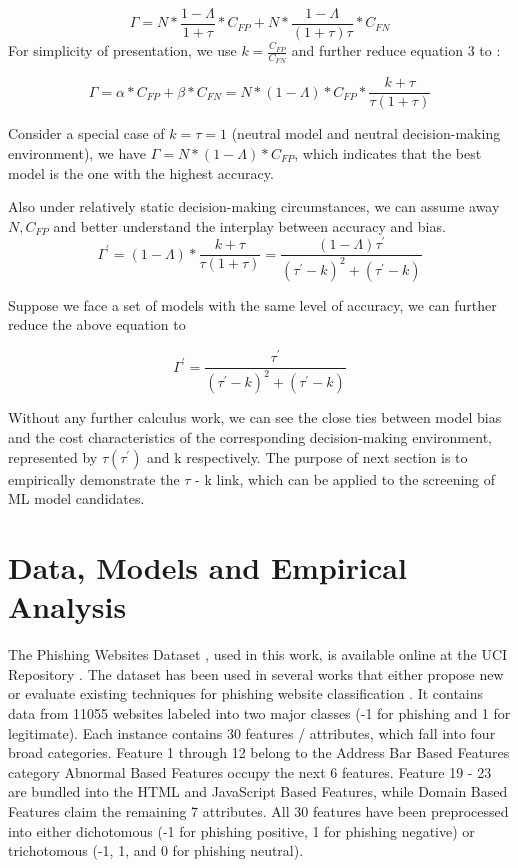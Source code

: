 \documentclass[deca,nonblindrev]{informs3} %
\begin{document}
\begin{equation}
\varGamma =  N*\frac {1-\varLambda}{1+\tau}*C_{FP} + N*\frac {1-\varLambda}{(1+\tau)\tau}*C_{FN}
\end{equation}
For simplicity of presentation, we use $k=\frac{C_{FP}}{C_{FN}}$ and further reduce  equation 3 to :

\begin{equation}
\varGamma = \alpha*C_{FP} + \beta*C_{FN} =  N*(1-\varLambda)*C_{FP}*\frac{k+\tau}{\tau(1+\tau)}
\end{equation}

Consider a special case of $ k=\tau=1$  (neutral model and neutral decision-making environment), we have  $\varGamma =  N*(1-\varLambda)*C_{FP}$, which indicates that the best model is the one with the highest accuracy.

Also under  relatively static decision-making circumstances, we can assume away $N, C_{FP} $ and better understand the interplay between accuracy and bias. 
\begin{equation}
\varGamma^{\prime} = (1-\varLambda)*\frac{k+\tau}{\tau(1+\tau)} = \frac{(1-\varLambda)\tau^\prime}{(\tau^\prime - k)^2+(\tau^\prime-k)}
\end{equation}

Suppose we face a set of models with the same level of accuracy, we can further reduce the above equation to

\begin{equation}
\varGamma^{\prime} = \frac{\tau^\prime}{(\tau^\prime - k)^2+(\tau^\prime-k)}
\end{equation} 

Without any further calculus work, we can see the close ties between model bias and the cost characteristics of the corresponding decision-making environment, represented by $\tau (\tau^\prime)$ and k respectively. The purpose of next section is to empirically demonstrate the $\tau$ -  k link, which can be applied to the screening of ML model candidates.


\section{Data, Models  and Empirical Analysis}

The Phishing Websites Dataset \citep{Mohammad2015} , used in this work, is available online at the UCI Repository \citep{Lichman:2013}. The dataset has been
used in several works that either propose new  or evaluate existing techniques for phishing website classification \citep{7727750, Mohammad2012, Mohammad2013, Mohammad2015a}. It contains data from 11055  websites  labeled into  two major classes (-1 for phishing and 1 for legitimate). Each instance contains 30 features / attributes, which fall into four broad categories. Feature 1 through 12 belong to the Address Bar Based Features category Abnormal Based Features occupy the next 6 features. Feature 19 - 23 are bundled into the HTML and JavaScript Based Features, while Domain Based Features claim the remaining 7 attributes. All 30 features have been  preprocessed into either dichotomous (-1 for phishing positive, 1 for phishing  negative) or trichotomous (-1, 1, and 0 for phishing neutral).  
\end{document}

